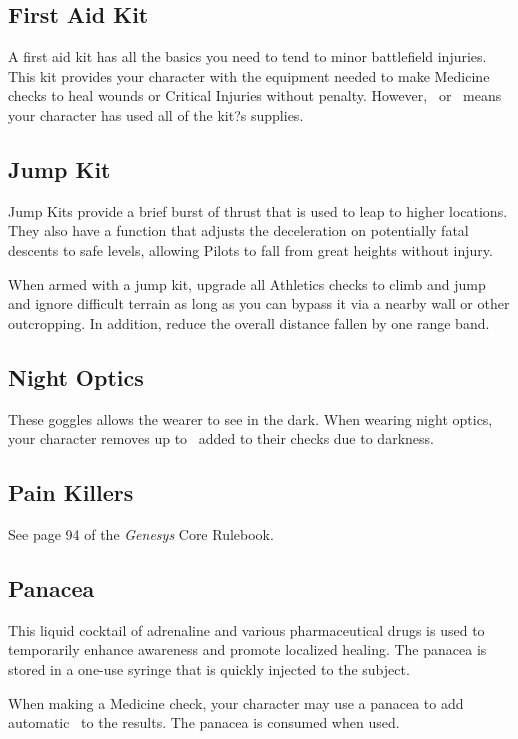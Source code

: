\subsection{First Aid Kit}
A first aid kit has all the basics you need to tend to minor battlefield injuries. This kit provides your character with the equipment needed to make Medicine checks to heal wounds or Critical Injuries without penalty. However, \Threat\Threat\Threat\ or \Despair\ means your character has used all of the kit?s supplies.

\subsection{Jump Kit}
Jump Kits provide a brief burst of thrust that is used to leap to higher locations. They also have a function that adjusts the deceleration on potentially fatal descents to safe levels, allowing Pilots to fall from great heights without injury.

When armed with a jump kit, upgrade all Athletics checks to climb and jump and ignore difficult terrain as long as you can bypass it via a nearby wall or other outcropping. In addition, reduce the overall distance fallen by one range band.

\subsection{Night Optics}
These goggles allows the wearer to see in the dark. When wearing night optics, your character
removes up to \SetbackDie\SetbackDie\ added to their checks due to darkness.


\subsection{Pain Killers}
See page 94 of the \emph{Genesys} Core Rulebook.

\subsection{Panacea}
This liquid cocktail of adrenaline and various pharmaceutical drugs is used to temporarily enhance awareness and promote localized healing. The panacea is stored in a one-use syringe that is quickly injected to the subject.

When making a Medicine check, your character may use a panacea to add automatic \Success\Advantage\ to the results. The panacea is consumed when used.

